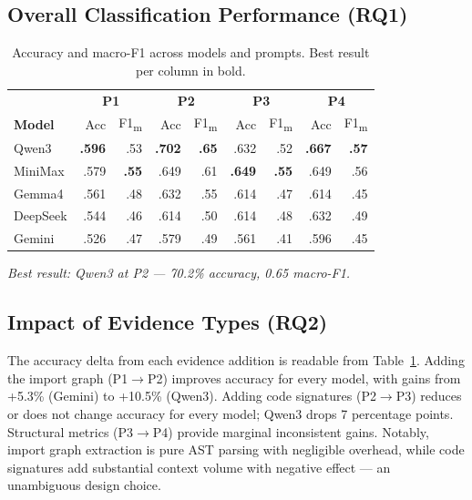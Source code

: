 \documentclass[runningheads]{llncs}
\begin{document}
\subsection{Overall Classification Performance (RQ1)}

\begin{table}[htbp]
\caption{Accuracy and macro-F1 across models and prompts. Best result per column in bold.}
\label{tab:accuracy}
\centering
\small
\begin{tabular}{l|rr|rr|rr|rr}
\toprule
& \multicolumn{2}{c|}{\textbf{P1}} & \multicolumn{2}{c|}{\textbf{P2}} & \multicolumn{2}{c|}{\textbf{P3}} & \multicolumn{2}{c}{\textbf{P4}} \\
\textbf{Model} & Acc & F1\textsubscript{m} & Acc & F1\textsubscript{m} & Acc & F1\textsubscript{m} & Acc & F1\textsubscript{m} \\
\midrule
Qwen3    & \textbf{.596} & .53 & \textbf{.702} & \textbf{.65} & .632 & .52 & \textbf{.667} & \textbf{.57} \\
MiniMax  & .579 & \textbf{.55} & .649 & .61 & \textbf{.649} & \textbf{.55} & .649 & .56 \\
Gemma4   & .561 & .48 & .632 & .55 & .614 & .47 & .614 & .45 \\
DeepSeek & .544 & .46 & .614 & .50 & .614 & .48 & .632 & .49 \\
Gemini   & .526 & .47 & .579 & .49 & .561 & .41 & .596 & .45 \\
\bottomrule
\end{tabular}
\end{table}

\textit{Best result: Qwen3 at P2 --- 70.2\% accuracy, 0.65 macro-F1.}

\subsection{Impact of Evidence Types (RQ2)}

The accuracy delta from each evidence addition is readable from Table~\ref{tab:accuracy}. Adding the import graph (P1$\rightarrow$P2) improves accuracy for every model, with gains from +5.3\% (Gemini) to +10.5\% (Qwen3). Adding code signatures (P2$\rightarrow$P3) reduces or does not change accuracy for every model; Qwen3 drops 7 percentage points. Structural metrics (P3$\rightarrow$P4) provide marginal inconsistent gains. Notably, import graph extraction is pure AST parsing with negligible overhead, while code signatures add substantial context volume with negative effect --- an unambiguous design choice.
\end{document}
